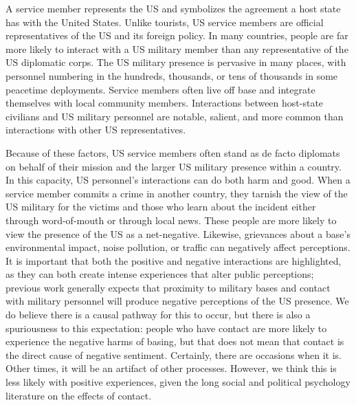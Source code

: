 A service member represents the US and symbolizes the agreement a host state has with the United States. Unlike tourists, US service members are official representatives of the US and its foreign policy. In many countries, people are far more likely to interact with a US military member than any representative of the US diplomatic corps. The US military presence is pervasive in many places, with personnel numbering in the hundreds, thousands, or tens of thousands in some peacetime deployments. Service members often live off base and integrate themselves with local community members. Interactions between host-state civilians and US military personnel are notable, salient, and more common than interactions with other US representatives. 

Because of these factors, US service members often stand as de facto diplomats on behalf of their mission and the larger US military presence within a country. In this capacity, US personnel's interactions can do both harm and good. When a service member commits a crime in another country, they tarnish the view of the US military for the victims and those who learn about the incident either through word-of-mouth or through local news. These people are more likely to view the presence of the US as a net-negative. Likewise, grievances about a base's environmental impact, noise pollution, or traffic can negatively affect perceptions. It is important that both the positive and negative interactions are highlighted, as they can both create intense experiences that alter public perceptions; previous work generally expects that proximity to military bases and contact with military personnel will produce negative perceptions of the US presence.\autocite{calder2007} We do believe there is a causal pathway for this to occur, but there is also a spuriousness to this expectation: people who have contact are more likely to experience the negative harms of basing, but that does not mean that contact is the direct cause of negative sentiment. Certainly, there are occasions when it is. Other times, it will be an artifact of other processes. However, we think this is less likely with positive experiences, given the long social and political psychology literature on the effects of contact. 


